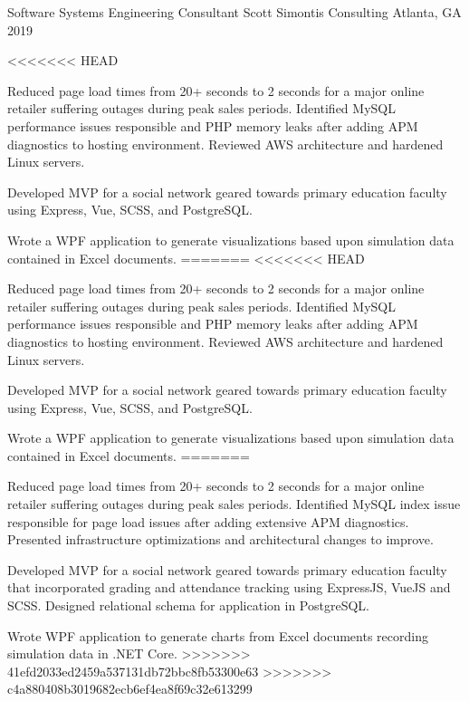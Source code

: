 \begin{cventries}
  \cventry
    {Software Systems Engineering Consultant} %
    {Scott Simontis Consulting} %
    {Atlanta, GA} %
    {2019} %
    {
      \begin{cvitems} %
<<<<<<< HEAD
        \item {Reduced page load times from 20+ seconds to 2 seconds for a major online retailer suffering outages during peak sales periods. Identified MySQL performance issues responsible and PHP memory leaks after adding  APM diagnostics to hosting environment. Reviewed AWS architecture and hardened Linux servers.}
        \item {Developed MVP for a social network geared towards primary education faculty using Express, Vue, SCSS, and PostgreSQL.}
        \item {Wrote a WPF application to generate visualizations based upon simulation data contained in Excel documents.}
=======
<<<<<<< HEAD
        \item {Reduced page load times from 20+ seconds to 2 seconds for a major online retailer suffering outages during peak sales periods. Identified MySQL performance issues responsible and PHP memory leaks after adding  APM diagnostics to hosting environment. Reviewed AWS architecture and hardened Linux servers.}
        \item {Developed MVP for a social network geared towards primary education faculty using Express, Vue, SCSS, and PostgreSQL.}
        \item {Wrote a WPF application to generate visualizations based upon simulation data contained in Excel documents.}
=======
        \item {Reduced page load times from 20+ seconds to 2 seconds for a major online retailer suffering outages during peak sales periods. Identified MySQL index issue responsible for page load issues after adding extensive APM diagnostics. Presented infrastructure optimizations and architectural changes to improve.}
        \item {Developed MVP for a social network geared towards primary education faculty that incorporated grading and attendance tracking using ExpressJS, VueJS and SCSS. Designed relational schema for application in PostgreSQL.}
        \item {Wrote WPF application to generate charts from Excel documents recording simulation data in .NET Core.}
>>>>>>> 41efd2033ed2459a537131db72bbc8fb53300e63
>>>>>>> c4a880408b3019682ecb6ef4ea8f69c32e613299
      \end{cvitems}
    }


\end{cventries}
